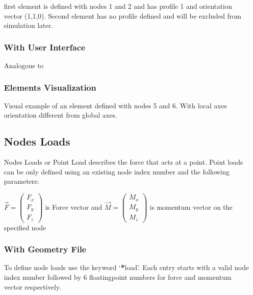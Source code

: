 \documentclass[letterpaper,10pt,english]{sphinxmanual}
\begin{document}
first element is defined with nodes 1 and 2 and has profile 1 and orientation vector (1,\sphinxhyphen{}1,0).
Second element has no profile defined and will be excluded from simulation later.


\subsubsection{With User Interface}
\label{\detokenize{making_a_model:id6}}
Analogous to {\hyperref[\detokenize{making_a_model:nodes-input}]{}}


\subsubsection{Elements Visualization}
\label{\detokenize{making_a_model:elements-visualization}}
Visual example of an element defined with nodes 5 and 6. With local axes orientation different from global axes.

\noindent{}


\subsection{Nodes Loads}
\label{\detokenize{making_a_model:nodes-loads}}
Nodes Loads or Point Load describes the force that acts at a point.
Point loads can be only defined using an existing node index number and the following parameters:

\(\vec{F}= \left( \begin{array}{c} F_x \\ F_y \\ F_z \end{array}\right)\) is Force vector
and
\(\vec{M}= \left( \begin{array}{c} M_x \\ M_y \\ M_z \end{array}\right)\) is momentum vector on the specified node


\subsubsection{With Geometry File}
\label{\detokenize{making_a_model:id7}}
To define node loads use the keyword ‘{\color{red}\bfseries{}*}load’. Each entry starts with a valid node index number followed by 6
floating\sphinxhyphen{}point numbers for force and momentum vector respectively.
\end{document}

